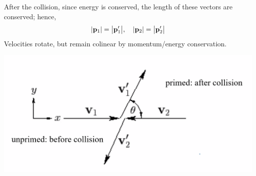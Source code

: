 \documentclass[../PHYS306Notes.tex]{subfiles}
\begin{document}
\begin{s}
After the collision, since energy is conserved, the length of these vectors are conserved; hence,
\[\abs{\mathbf{p}_1} = \abs{\mathbf{p}'_1}, \quad \abs{\mathbf{p}_2} = \abs{\mathbf{p}'_2}\]
Velocities rotate, but remain colinear by momentum/energy conservation.
\begin{center}
    \includegraphics[scale=0.5]{Lecture-29/l29-img2.png}
\end{center}
\end{s}
\end{document}
